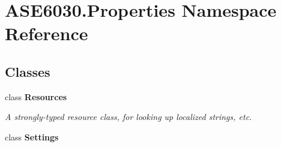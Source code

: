 \hypertarget{namespace_a_s_e6030_1_1_properties}{}\section{A\+S\+E6030.\+Properties Namespace Reference}
\label{namespace_a_s_e6030_1_1_properties}
\subsection*{Classes}
\begin{DoxyCompactItemize}
\item 
class {\bfseries Resources}
\begin{DoxyCompactList}\small\item\em A strongly-\/typed resource class, for looking up localized strings, etc. \end{DoxyCompactList}\item 
class {\bfseries Settings}
\end{DoxyCompactItemize}
